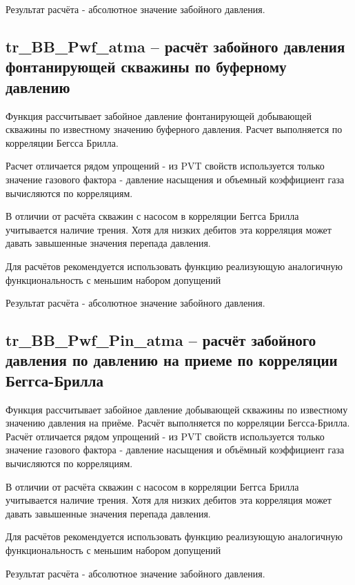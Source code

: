 Результат расчёта - абсолютное значение забойного давления. 

\subsection{tr\_BB\_Pwf\_atma – расчёт забойного давления фонтанирующей скважины по буферному давлению}
Функция рассчитывает забойное давление фонтанирующей добывающей скважины по известному значению буферного давления. Расчет выполняется по корреляции Бегсса Брилла. 

Расчет отличается рядом упрощений - из PVT свойств используется только значение газового фактора - давление насыщения и объемный коэффициент газа вычисляются по корреляциям. 

В отличии от расчёта скважин с насосом в корреляции Беггса Брилла учитывается наличие трения. Хотя для низких дебитов эта корреляция может давать завышенные значения перепада давления. 

Для расчётов рекомендуется использовать функцию \unf{} реализующую аналогичную функциональность с меньшим набором допущений

Результат расчёта - абсолютное значение забойного давления. 

\subsection{tr\_BB\_Pwf\_Pin\_atma – расчёт забойного давления по давлению на приеме по корреляции Беггса-Брилла}
Функция рассчитывает забойное давление  добывающей скважины по известному значению давления на приёме. Расчёт выполняется по корреляции Бегсса-Брилла. 
Расчёт отличается рядом упрощений - из PVT свойств используется только значение газового фактора - давление насыщения и объёмный коэффициент газа вычисляются по корреляциям. 

В отличии от расчёта скважин с насосом в корреляции Беггса Брилла учитывается наличие трения. Хотя для низких дебитов эта корреляция может давать завышенные значения перепада давления. 

Для расчётов рекомендуется использовать функцию \unf{} реализующую аналогичную функциональность с меньшим набором допущений

Результат расчёта - абсолютное значение забойного давления. 


